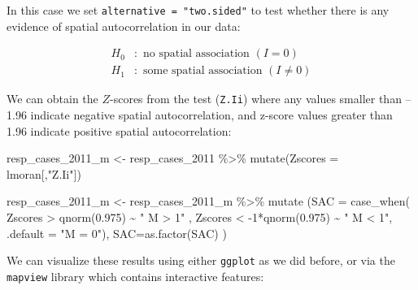 \documentclass[
  letterpaper,
  DIV=11,
  numbers=noendperiod]{scrartcl}
\newenvironment{Shaded}{\begin{snugshade}}{\end{snugshade}}
\newcommand{\AttributeTok}[1]{\textcolor[rgb]{0.40,0.45,0.13}{#1}}
\newcommand{\DecValTok}[1]{\textcolor[rgb]{0.68,0.00,0.00}{#1}}
\newcommand{\FloatTok}[1]{\textcolor[rgb]{0.68,0.00,0.00}{#1}}
\newcommand{\FunctionTok}[1]{\textcolor[rgb]{0.28,0.35,0.67}{#1}}
\newcommand{\NormalTok}[1]{\textcolor[rgb]{0.00,0.23,0.31}{#1}}
\newcommand{\OtherTok}[1]{\textcolor[rgb]{0.00,0.23,0.31}{#1}}
\newcommand{\SpecialCharTok}[1]{\textcolor[rgb]{0.37,0.37,0.37}{#1}}
\newcommand{\StringTok}[1]{\textcolor[rgb]{0.13,0.47,0.30}{#1}}
\begin{document}
\begin{Shaded}
\end{Shaded}

In this case we set \texttt{alternative\ =\ "two.sided"} to test whether
there is any evidence of spatial autocorrelation in our data:

\[
\begin{aligned}
H_0&: \text{ no spatial association } (I=0)\\
H_1&: \text{ some spatial association } (I \neq 0)
\end{aligned}
\]

We can obtain the \(Z\)-scores from the test (\texttt{Z.Ii}) where any
values smaller than --1.96 indicate negative spatial autocorrelation,
and z-score values greater than 1.96 indicate positive spatial
autocorrelation:

\begin{Shaded}
\begin{Highlighting}[]
\NormalTok{resp\_cases\_2011\_m }\OtherTok{\textless{}{-}}\NormalTok{ resp\_cases\_2011 }\SpecialCharTok{\%\textgreater{}\%} \FunctionTok{mutate}\NormalTok{(}\AttributeTok{Zscores =}\NormalTok{ lmoran[,}\StringTok{"Z.Ii"}\NormalTok{])}

\NormalTok{resp\_cases\_2011\_m }\OtherTok{\textless{}{-}}\NormalTok{ resp\_cases\_2011\_m }\SpecialCharTok{\%\textgreater{}\%} 
  \FunctionTok{mutate}\NormalTok{ (}\AttributeTok{SAC =} \FunctionTok{case\_when}\NormalTok{(}
\NormalTok{  Zscores }\SpecialCharTok{\textgreater{}} \FunctionTok{qnorm}\NormalTok{(}\FloatTok{0.975}\NormalTok{) }\SpecialCharTok{\textasciitilde{}} \StringTok{" M \textgreater{} 1"}\NormalTok{ ,}
\NormalTok{  Zscores }\SpecialCharTok{\textless{}} \SpecialCharTok{{-}}\DecValTok{1}\SpecialCharTok{*}\FunctionTok{qnorm}\NormalTok{(}\FloatTok{0.975}\NormalTok{) }\SpecialCharTok{\textasciitilde{}} \StringTok{" M \textless{} 1"}\NormalTok{,}
  \AttributeTok{.default =} \StringTok{"M = 0"}\NormalTok{),}
  \AttributeTok{SAC=}\FunctionTok{as.factor}\NormalTok{(SAC)}
\NormalTok{)}
\end{Highlighting}
\end{Shaded}

We can visualize these results using either \texttt{ggplot} as we did
before, or via the \texttt{mapview} library which contains interactive
features:
\end{document}
